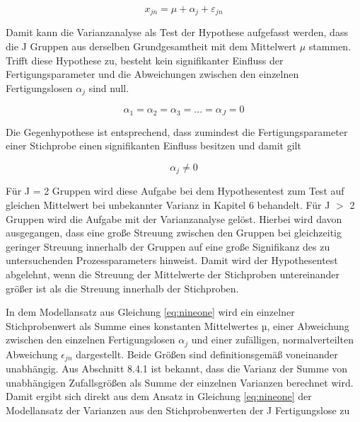 \begin{equation}\label{eq:nineone}
x_{jn} =\mu +\alpha _{j} +\varepsilon _{jn}
\end{equation}

\noindent Damit kann die Varianzanalyse als Test der Hypothese aufgefasst werden, dass die J Gruppen aus derselben Grundgesamtheit mit dem Mittelwert $\mu$ stammen. Trifft diese Hypothese zu, besteht kein signifikanter Einfluss der Fertigungsparameter und die Abweichungen zwischen den einzelnen Fertigungslosen $\alpha$${}_{j}$ sind null.

\begin{equation}\label{eq:ninetwo}
\alpha _{1} =\alpha _{2} =\alpha _{3} =...=\alpha _{J} =0
\end{equation}

\noindent Die Gegenhypothese ist entsprechend, dass zumindest die Fertigungsparameter einer Stichprobe einen signifikanten Einfluss besitzen und damit gilt

\begin{equation}\label{eq:ninethree}
\alpha _{j} \ne 0
\end{equation}

\noindent F\"{u}r J = 2 Gruppen wird diese Aufgabe bei dem Hypothesentest zum Test auf gleichen Mittelwert bei unbekannter Varianz in Kapitel 6 behandelt. F\"{u}r J $\mathrm{>}$ 2 Gruppen wird die Aufgabe mit der Varianzanalyse gel\"{o}st. Hierbei wird davon ausgegangen, dass eine gro{\ss}e Streuung zwischen den Gruppen bei gleichzeitig geringer Streuung innerhalb der Gruppen auf eine gro{\ss}e Signifikanz des zu untersuchenden Prozessparameters hinweist. Damit wird der Hypothesentest abgelehnt, wenn die Streuung der Mittelwerte der Stichproben untereinander gr\"{o}{\ss}er ist als die Streuung innerhalb der Stichproben.

\noindent In dem Modellansatz aus Gleichung \eqref{eq:nineone} wird ein einzelner Stichprobenwert als Summe eines konstanten Mittelwertes µ, einer Abweichung zwischen den einzelnen Fertigungslosen $\alpha_{j}$ und einer zuf\"{a}lligen, normalverteilten Abweichung $\epsilon_{jn}$ dargestellt. Beide Gr\"{o}{\ss}en sind definitionsgem\"{a}{\ss} voneinander unabh\"{a}ngig. Aus Abschnitt 8.4.1 ist bekannt, dass die Varianz der Summe von unabh\"{a}ngigen Zufallsgr\"{o}{\ss}en als Summe der einzelnen Varianzen berechnet wird. Damit ergibt sich direkt aus dem Ansatz in Gleichung \eqref{eq:nineone} der Modellansatz der Varianzen aus den Stichprobenwerten der J Fertigungslose zu

